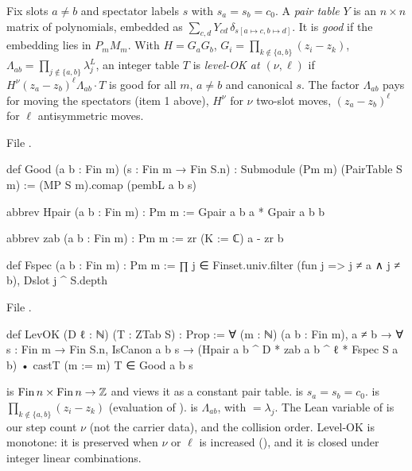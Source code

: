 \begin{definition}\label{l24:def:levok}
Fix slots $a\neq b$ and spectator labels $s$ with $s_a=s_b=c_0$. A \emph{pair table} $Y$ is an $n\times n$ matrix of
polynomials, embedded as $\sum_{c,d}Y_{cd}\,\delta_{s[a\mapsto c,b\mapsto d]}$. It is \emph{good} if the embedding lies
in $P_mM_m$. With $H=G_aG_b$, $G_i=\prod_{k\notin\{a,b\}}(z_i-z_k)$, $\Lambda_{ab}=\prod_{j\notin\{a,b\}}\lambda_j^L$, an integer
table $T$ is \emph{level-OK at $(\nu,\ell)$} if $H^\nu(z_a-z_b)^\ell\Lambda_{ab}\cdot T$ is good for all $m$, $a\neq b$ and canonical $s$.
The factor $\Lambda_{ab}$ pays for moving the spectators (item 1 above), $H^\nu$ for $\nu$ two-slot moves, $(z_a-z_b)^\ell$ for
$\ell$ antisymmetric moves.
\end{definition}
\noindent File .
\begin{leancode}
def Good (a b : Fin m) (s : Fin m → Fin S.n) : Submodule (Pm m) (PairTable S m) :=
  (MP S m).comap (pembL a b s)

abbrev Hpair (a b : Fin m) : Pm m := Gpair a b a * Gpair a b b

abbrev zab (a b : Fin m) : Pm m := zr (K := ℂ) a - zr b

def Fspec (a b : Fin m) : Pm m :=
  ∏ j ∈ Finset.univ.filter (fun j => j ≠ a ∧ j ≠ b), Dslot j ^ S.depth
\end{leancode}
\noindent File .
\begin{leancode}
def LevOK (D ℓ : ℕ) (T : ZTab S) : Prop :=
  ∀ (m : ℕ) (a b : Fin m), a ≠ b → ∀ s : Fin m → Fin S.n, IsCanon a b s →
    (Hpair a b ^ D * zab a b ^ ℓ * Fspec S a b) • castT (m := m) T ∈ Good a b s
\end{leancode}

\begin{dictionary}
 is $\mathrm{Fin}\,n\times\mathrm{Fin}\,n\to{\mathbb{Z}}$ and  views it as a constant pair table.
 is $s_a=s_b=c_0$.  is $\prod_{k\notin\{a,b\}}(z_i-z_k)$ (evaluation of
).  is $\Lambda_{ab}$, with  $=\lambda_j$. The Lean variable  of  is our
step count $\nu$ (not the carrier data), and  the collision order. Level-OK is monotone: it is preserved when $\nu$ or $\ell$
is increased (), and it is closed under integer linear combinations.
\end{dictionary}

